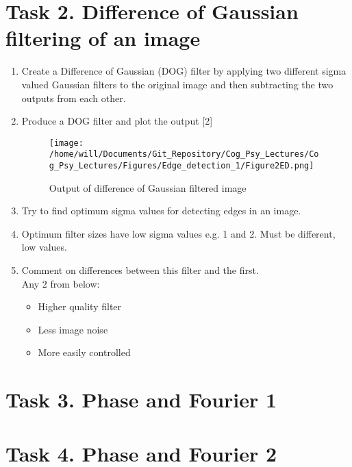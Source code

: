 \documentclass[12pt,english]{scrartcl}
\begin{document}
\section*{Task 2. Difference of Gaussian filtering of an image}

\begin{enumerate}
 \color{black}
 \item Create a Difference of Gaussian (DOG) filter by applying two different sigma valued Gaussian  filters to the original image and then subtracting the two outputs from each other. \\ 
 \color{blue}
 \item[]
 Produce a DOG filter and plot the output [2] \\

 \begin{figure*}[htbp]
 \centering
 \texttt{[image: /home/will/Documents/Git\_Repository/Cog\_Psy\_Lectures/Cog\_Psy\_Lectures/Figures/Edge\_detection\_1/Figure2ED.png]}
 \caption{Output of difference of Gaussian filtered image}
 \label{fig:lena_edge}
 \end{figure*}

 \color{black}
 \item Try to find optimum sigma values for detecting edges in an image.
 \color{blue}
 \item[]
 Optimum filter sizes have low sigma values e.g. 1 and 2. Must be different, low values.
 
 \color{black}
 \item Comment on differences between this filter and the first. \\
 \color{blue}
 Any 2 from below:
 \begin{itemize}
 \item Higher quality filter 
 \item Less image noise
 \item More easily controlled
 \end{itemize}
\end{enumerate}

\section*{Task 3. Phase and Fourier 1}

\section*{Task 4. Phase and Fourier 2}

 
\end{document}
